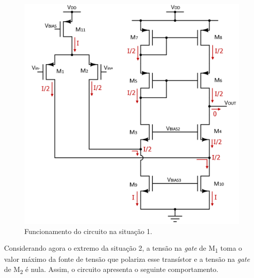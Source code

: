 \documentclass[11pt]{article}
\numberwithin{equation}{section}
\begin{document}
\begin{figure}[H]
	\centering
	\includegraphics[keepaspectratio=true, scale=0.47]{teoricas/situacao1}
	\vspace{-0.5em}
	\caption{Funcionamento do circuito na situação 1.}
	\vspace{-0.8em}
\end{figure} 

Considerando agora o extremo da situação 2, a tensão na \textit{gate} de M\textsubscript{1} toma o valor máximo da fonte de tensão que polariza esse transístor e a tensão na \textit{gate} de M\textsubscript{2} é nula. Assim, o circuito apresenta o seguinte comportamento.
\end{document}
